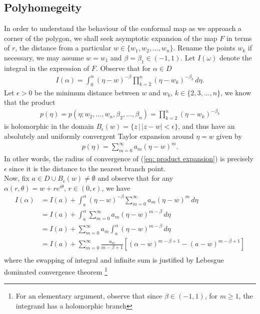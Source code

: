 \documentclass{article}
\begin{document}
\subsection{Polyhomegeity} 
In order to understand the behaviour of the conformal map as we approach a corner of the polygon, we shall seek asymptotic expansion of the map $F$ in terms of $r$, the distance from a particular $w \in \{w_1, w_2, \dots, w_n\}$. Rename the points $w_k$ if necessary, we may assume $w = w_1$ and $\beta = \beta_1 \in (-1, 1)$. Let $I(\omega)$ denote the integral in the expression of $F$. Observe that for $\alpha \in D$
\begin{align*}
I(\alpha) = \int_0^\alpha (\eta - w)^{-\beta} \prod_{k = 2}^n (\eta - w_k)^{-\beta_k} \, d\eta. 
\end{align*}
Let $\epsilon > 0 $ be the minimum distance between $w$ and $w_k, \, k  \in \{2, 3, \dots, n\}$, we know that the product
\begin{align*}
p(\eta) = p(\eta; w_2, \dots, w_n, \beta_2, \dots, \beta_n) = \prod_{k = 2}^n (\eta - w_k)^{-\beta_k} 
\end{align*}
is holomorphic in the domain $B_\epsilon(w) = \{z\, |\, |z - w| < \epsilon\}$, and thus have an absolutely and uniformly convergent Taylor expansion around $\eta = w$ given by 
\begin{align} \label{eq: product expansion} 
p(\eta) = \sum_{m = 0}^\infty a_m (\eta - w)^m. 
\end{align}
In other words, the radius of convergence of (\ref{eq: product expansion}) is precisely $\epsilon$ since it is the distance to the nearest branch point. \\
\noindent Now, fix $a \in D \cup B_\epsilon(w) \neq \emptyset$ and observe that for any $\alpha(r, \theta) = w + re^{i \theta}, \, r \in (0, \epsilon)$, we have 
\begin{align*}
I(\alpha) 
&= I(a) + \int_a^\alpha (\eta - w)^{-\beta} \sum_{m = 0}^\infty a_m (\eta - w)^m \, d\eta \\
&= I(a) + \int_a^\alpha \sum_{m = 0}^\infty a_m (\eta - w)^{m - \beta} \, d\eta \\
&= I(a) + \sum_{m = 0}^\infty a_m \int_a^\alpha  (\eta - w)^{m - \beta} \, d\eta \\
&= I(a) + \sum_{m = 0}^\infty \frac{a_m}{m - \beta + 1} \left[(\alpha - w)^{m - \beta + 1}  - (a - w)^{m - \beta + 1}\right ] \\
\end{align*}
where the swapping of integral and infinite sum is justified by Lebesgue dominated convergence theorem \footnote{For an elementary argument, observe that since $\beta \in (-1, 1)$, for $m \geq 1$, the integrand has a holomorphic branch }
\end{document}
